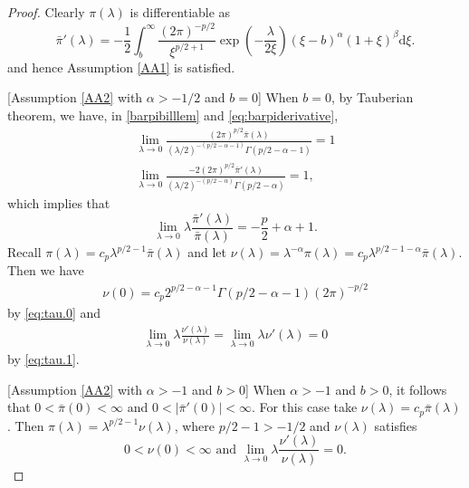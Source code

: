 \documentclass[preprint,11pt]{imsart}
\numberwithin{equation}{section}
\theoremstyle{plain}
\theoremstyle{definition}
\theoremstyle{remark}
\newcommand{\rd}{\mathrm{d}}
\begin{document}
\begin{proof}
 Clearly $\pi(\lambda)$ is differentiable as
\begin{equation}\label{eq:barpiderivative}
 \bar{\pi}'(\lambda)=-\frac{1}{2}
\int_b^\infty\frac{(2\pi)^{-p/2}}{\xi^{p/2+1}}\exp\left(-\frac{\lambda}{2\xi}\right)
  (\xi-b)^\alpha(1+\xi)^\beta\rd \xi.
\end{equation}  
 and hence Assumption \ref{AA1} is satisfied.

 [Assumption \ref{AA2} with $\alpha>-1/2$ and $b=0$]
When $b=0$, by Tauberian theorem, we have, in \eqref{barpibilllem} and \eqref{eq:barpiderivative},
\begin{equation}\label{eq:tau.0}
 \begin{split}
\lim_{\lambda\to 0}\frac{(2\pi)^{p/2}\bar{\pi}(\lambda)}{(\lambda/2)^{-(p/2-\alpha-1)}\Gamma(p/2-\alpha-1)}=1 \\
\lim_{\lambda\to 0}\frac{-2(2\pi)^{p/2}\bar{\pi}'(\lambda)}{(\lambda/2)^{-(p/2-\alpha)}\Gamma(p/2-\alpha)}=1,
\end{split}
\end{equation}
which implies that
\begin{equation}\label{eq:tau.1}
 \lim_{\lambda\to 0}\lambda\frac{\bar{\pi}'(\lambda)}{\bar{\pi}(\lambda)}=-\frac{p}{2}+\alpha+1.
\end{equation}
Recall $ \pi(\lambda)=c_p\lambda^{p/2-1}\bar{\pi}(\lambda)$ and let $\nu(\lambda)=\lambda^{-\alpha}\pi(\lambda)=c_p\lambda^{p/2-1-\alpha}\bar{\pi}(\lambda)$. Then we have
\begin{align*}
 \nu(0)=c_p2^{p/2-\alpha-1}\Gamma(p/2-\alpha-1)(2\pi)^{-p/2}
\end{align*}
by \eqref{eq:tau.0} and 
\begin{align*}
 \lim_{\lambda\to 0}\lambda\frac{\nu'(\lambda)}{\nu(\lambda)}=
 \lim_{\lambda\to 0}\lambda\nu'(\lambda)=0
\end{align*}
by \eqref{eq:tau.1}.

 [Assumption \ref{AA2} with $\alpha>-1$ and $b>0$]
 When $\alpha>-1$ and $b>0$, it follows that $0<\bar{\pi}(0)<\infty$ and $0<|\bar{\pi}'(0)|<\infty$.
 For this case take $ \nu(\lambda)=c_p\bar{\pi}(\lambda)$.
 Then $\pi(\lambda)=\lambda^{p/2-1}\nu(\lambda)$, where $p/2-1>-1/2$ and
$\nu(\lambda)$ satisfies 
\begin{equation*}
 0<\nu(0)<\infty \text{ and }
   \lim_{\lambda\to 0}\lambda\frac{\nu'(\lambda)}{\nu(\lambda)}=0.
\end{equation*}


\end{proof}
\end{document}
